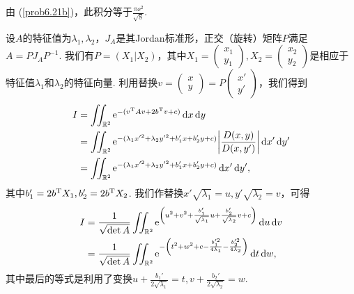 \begin{solution}
  \begin{inparaenum}[(a)]
    \item 由 (\ref{prob6.21b})，此积分等于$\frac{\pi\ee^2}{\sqrt8}$.

    \item 设$A$的特征值为$\lambda_1,\lambda_2$，$J_A$是其Jordan标准形，正交（旋转）矩阵$P$满足$A=PJ_AP^{-1}$. 我们有$P=(X_1|X_2)$，其中$X_1=\begin{pmatrix}
          x_1 \\
          y_1
        \end{pmatrix},X_2=\begin{pmatrix}
          x_2 \\
          y_2
        \end{pmatrix}$是相应于特征值$\lambda_1$和$\lambda_2$的特征向量. 利用替换$v=\begin{pmatrix}
          x \\
          y
        \end{pmatrix}=P\begin{pmatrix}
          x' \\
          y'
        \end{pmatrix}$，我们得到
        \begin{align*}
          I & = \iint_{\MR^2} \ee^{-(v\TT Av+2b\TT v+c)} \dif x \dif y \\
          & = \iint_{\MR^2} \ee^{-(\lambda_1x'^2+\lambda_2y'^2
          +b_1'x+b_2'y+c)} \left| \frac{D(x,y)}{D(x,y')} \right| \dif x' \dif y' \\
          & = \iint_{\MR^2} \ee^{-(\lambda_1x'^2+\lambda_2y'^2
          +b_1'x+b_2'y+c)} \dif x' \dif y',
        \end{align*}
    其中$b_1'=2b^{\mathrm T} X_1,b_2'=2b^{\mathrm T} X_2$. 我们作替换$x'\sqrt{\lambda_1}=u,y'\sqrt{\lambda_2}=v$，可得
    \begin{align*}
      I & = \frac1{\sqrt{\det A}} \iint_{\MR^2} \ee^{\left( u^2 + v^2 + \frac{b_1'}{\sqrt{\lambda_1}}u + \frac{b_2'}{\sqrt{\lambda_2}}v + c \right)}\dif u \dif v \\
      & = \frac1{\sqrt{\det A}} \iint_{\MR^2} \ee^{-\left( t^2 + w^2 + c - \frac{b_1'^2}{4\lambda_1} - \frac{b_2'^2}{4\lambda_2} \right)} \dif t \dif w ,
    \end{align*}
    其中最后的等式是利用了变换$u+\frac{b_1'}{2\sqrt{\lambda_1}}=t,v+\frac{b_2'}{
    2\sqrt{\lambda_2}}=w$.


\end{inparaenum}
\end{solution}
